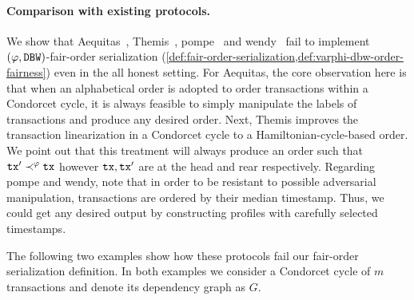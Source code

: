 \paragraph{Comparison with existing protocols.}
%
We show that \textsf{Aequitas}~\cite{C:KZGJ20}, \textsf{Themis}~\cite{CCS:KDLJK23}, \textsf{pompe}~\cite{OSDI:ZSCZA20} and \textsf{wendy}~\cite{AFT:Kursawe20} fail to implement $(\varphi, \mathtt{DBW})$-fair-order serialization (\cref{def:fair-order-serialization,def:varphi-dbw-order-fairness}) even in the all honest setting.
%
For \textsf{Aequitas}, the core observation here is that when an alphabetical order is adopted to order transactions within a Condorcet cycle, it is always feasible to simply manipulate the labels of transactions and produce any desired order.
%
Next, \textsf{Themis} improves the transaction linearization in a Condorcet cycle to a Hamiltonian-cycle-based order.
%
We point out that this treatment will always produce an order such that $\mathtt{tx}' \prec^\varphi \mathtt{tx}$ however $\mathtt{tx}, \mathtt{tx}'$ are at the head and rear respectively.
%
Regarding \textsf{pompe} and \textsf{wendy}, note that in order to be resistant to possible adversarial manipulation, transactions are ordered by their median timestamp.
%
Thus, we could get any desired output by constructing profiles with carefully selected timestamps.

The following two examples show how these protocols fail our fair-order serialization definition.
%
In both examples we consider a Condorcet cycle of $m$ transactions and denote its dependency graph as $G$.

